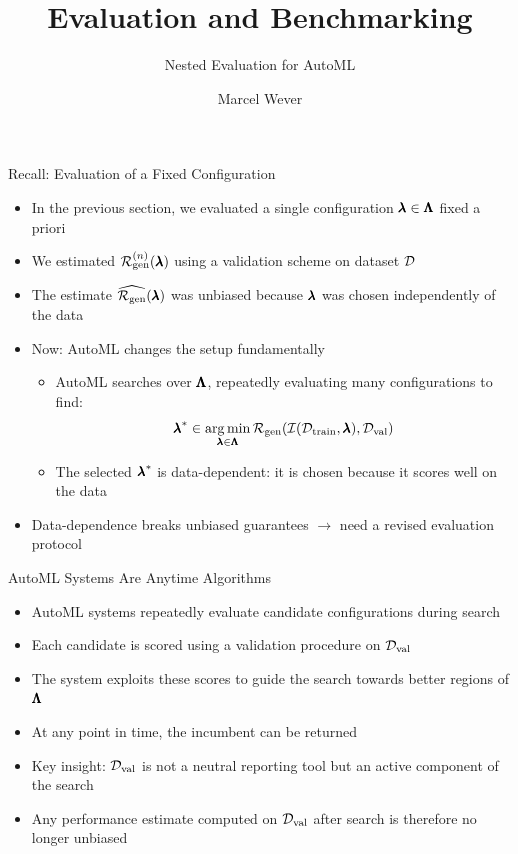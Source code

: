 \documentclass[main]{subfiles}
\title[Evaluation and Benchmarking]{Evaluation and Benchmarking}
\subtitle{Nested Evaluation for AutoML}
\author[Marcel Wever]{Marcel Wever}
\date{}
\begin{document}
	
	\maketitle
	

\begin{frame}{Recall: Evaluation of a Fixed Configuration}
    \begin{itemize}
        \item In the previous section, we evaluated a single configuration $\pmb{\lambda} \in \pmb{\Lambda}$ fixed \alert{a priori}
        \item We estimated $\mathcal{R}_{\text{gen}}^{(n)}(\pmb{\lambda})$ using a validation scheme on dataset $\mathcal{D}$
        \item The estimate $\widehat{\mathcal{R}_{\text{gen}}}(\pmb{\lambda})$ was unbiased because $\pmb{\lambda}$ was chosen independently of the data
    \end{itemize}
    \vspace{.3cm}
    \begin{itemize}
        \item \alert{Now}: AutoML changes the setup fundamentally
        \begin{itemize}
            \item AutoML searches over $\pmb{\Lambda}$, repeatedly evaluating many configurations to find:
            $${\pmb{\lambda}}^* \in \operatorname*{arg\,min}_{\pmb{\lambda} \in \pmb{\Lambda}} \mathcal{R}_{\text{gen}}\!\left(\mathcal{I}(\mathcal{D}_{\text{train}}, \pmb{\lambda}), \mathcal{D}_{\text{val}}\right)$$
            \item The selected ${\pmb{\lambda}}^*$ is \alert{data-dependent}: it is chosen because it scores well on the data
        \end{itemize}
        \item Data-dependence breaks unbiased guarantees $\rightarrow$ need a revised evaluation protocol
    \end{itemize}
\end{frame}

\begin{frame}[c]{AutoML Systems Are Anytime Algorithms}

\begin{itemize}
    \item AutoML systems repeatedly evaluate candidate configurations during search
    \item Each candidate is scored using a validation procedure on $\mathcal{D}_{\text{val}}$
    \item The system exploits these scores to guide the search towards better regions of $\pmb{\Lambda}$
    \item At any point in time, the incumbent can be returned
    \item \alert{Key insight}: $\mathcal{D}_{\text{val}}$ is not a neutral reporting tool but an active component of the search
    \item Any performance estimate computed on $\mathcal{D}_{\text{val}}$ after search is therefore no longer unbiased
\end{itemize}
\end{frame}
\end{document}
